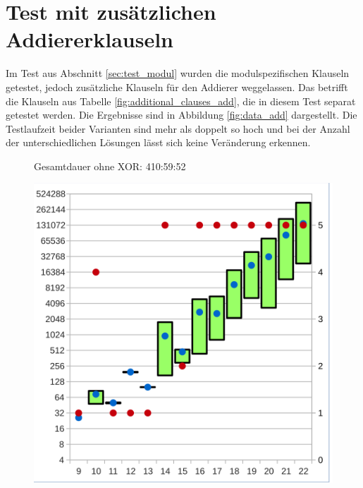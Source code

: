 \section{Test mit zusätzlichen Addiererklauseln} %
\label{sec:test_234}

Im Test aus Abschnitt \ref{sec:test_modul} wurden die modulspezifischen Klauseln getestet, jedoch zusätzliche Klauseln für den Addierer weggelassen.
Das betrifft die Klauseln aus Tabelle \ref{fig:additional_clauses_add}, die in diesem Test separat getestet werden.
Die Ergebnisse sind in Abbildung \ref{fig:data_add} dargestellt. Die Testlaufzeit beider Varianten sind mehr als doppelt so hoch und bei der
Anzahl der unterschiedlichen Lösungen lässt sich keine Veränderung erkennen.
\begin{figure}[!h]
  \centering
  \begin{minipage}[c]{0.45\textwidth}
  \begin{flushleft}Gesamtdauer ohne XOR: 410:59:52\end{flushleft}
  \includegraphics[scale=0.55]{images/data_add_knf}
  \end{minipage}
  \begin{minipage}[c]{0.09\textwidth}
  ~~
  \end{minipage}
  \begin{minipage}[c]{0.45\textwidth}

\end{minipage}
\end{figure}

